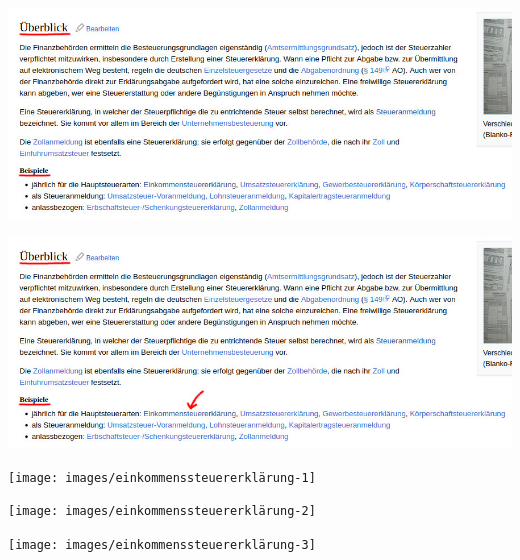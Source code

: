 \documentclass{beamer}
\begin{document}
		{
		\begin{frame}[plain]
			\begin{center}
				\includegraphics[width=\linewidth]{images/steuererklärung-überblick-1}
			\end{center}
		\end{frame}
		\begin{frame}[plain]
			\begin{center}
				\includegraphics[width=\linewidth]{images/steuererklärung-überblick-2}
			\end{center}
		\end{frame}
		\begin{frame}[plain]
			\begin{center}
				\texttt{[image: images/einkommenssteuererklärung-1]}
			\end{center}
		\end{frame}
		\begin{frame}[plain]
			\begin{center}
				\texttt{[image: images/einkommenssteuererklärung-2]}
			\end{center}
		\end{frame}
		\begin{frame}[plain]
			\begin{center}
				\texttt{[image: images/einkommenssteuererklärung-3]}
			\end{center}
		\end{frame}
		}
\end{document}
